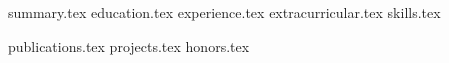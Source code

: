\documentclass[11pt, a4paper]{awesome-cv}
\newcommand*{\sectiondir}{resume/}
\begin{document}
\makecvheader


{summary.tex}
{education.tex}
{experience.tex}
{extracurricular.tex}
{skills.tex}

\hfill

{publications.tex}
{projects.tex}
{honors.tex}
\end{document}
